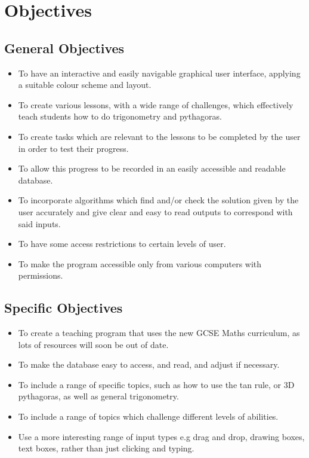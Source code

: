 \section{Objectives}

\subsection{General Objectives}

\begin{itemize}
	\item To have an interactive and easily navigable graphical user interface, applying a suitable colour scheme and layout.
	\item To create various lessons, with a wide range of challenges, which effectively teach students how to do trigonometry and pythagoras. 
	\item To create tasks which are relevant to the lessons to be completed by the user in order to test their progress.
	\item To allow this progress to be recorded in an easily accessible and readable database.
	\item To incorporate algorithms which find and/or check the solution given by the user accurately and give clear and easy to read outputs to correspond with said inputs.
	\item To have some access restrictions to certain levels of user.
	\item To make the program accessible only from various computers with permissions.
\end{itemize}

\subsection{Specific Objectives}

\begin{itemize}
	\item To create a teaching program that uses the new GCSE Maths curriculum, as lots of resources will soon be out of date. 
	\item To make the database easy to access, and read, and adjust if necessary.
	\item To include a range of specific topics, such as how to use the tan rule, or 3D pythagoras, as well as general trigonometry.
	\item To include a range of topics which challenge different levels of abilities.
	\item Use a more interesting range of input types e.g drag and drop, drawing boxes, text boxes, rather than just clicking and typing.
\end{itemize}

